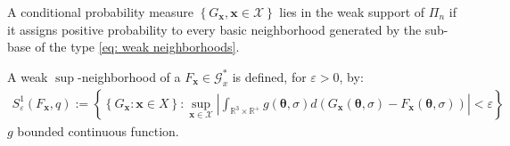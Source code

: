 A conditional probability measure $\left\{G_{\boldsymbol{x}}, \boldsymbol{x} \in \mathcal{X}\right\}$ lies in the weak support of $\Pi_n$ if it assigns positive probability to every basic neighborhood generated by the sub-base of the type \eqref{eq: weak neighborhoods}. 

\begin{definition}
A weak $\sup$-neighborhood of a $F_{\boldsymbol{x}} \in \mathscr{G}_x^{*}$ is defined, for $\varepsilon>0$, by:
\begin{align}\label{eq: weak sup integrated neighborhoods}
    S^{\scriptscriptstyle{1}}_{\varepsilon}(F_{\boldsymbol{x}},q) := \left\{\left\{G_{\boldsymbol{x}}: \boldsymbol{x} \in X\right\}:\sup_{\boldsymbol{x} \in \mathcal{X}} \left| \int_{\mathbb{R}^3 \times \mathbb{R}^+}  g(\boldsymbol{\theta}, \sigma) d\left(G_{\boldsymbol{x}}(\boldsymbol{\theta}, \sigma)-F_{\boldsymbol{x}}(\boldsymbol{\theta}, \sigma)\right) \right| <\varepsilon\right\}
\end{align}
$g$ bounded continuous function.
    
\end{definition}

